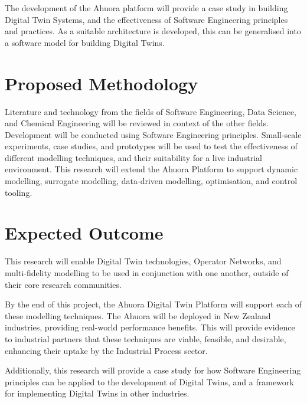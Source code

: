 \documentclass[12pt]{article}
\begin{document}
The development of the Ahuora platform will provide a case study in building Digital Twin Systems, and the effectiveness of Software Engineering principles and practices. As a suitable architecture is developed, this can be generalised into a software model for building Digital Twins.  

\section*{Proposed Methodology}

% 

Literature and technology from the fields of Software Engineering, Data Science, and Chemical Engineering will be reviewed in context of the other fields.
Development will be conducted using Software Engineering principles. Small-scale experiments, case studies, and prototypes will be used to test the effectiveness of different modelling techniques, and their suitability for a live industrial environment. 
This research will extend the Ahuora Platform to support dynamic modelling, surrogate modelling, data-driven modelling, optimisation, and control tooling. 

\section*{Expected Outcome}

This research will enable Digital Twin technologies, Operator Networks, and multi-fidelity modelling to be used in conjunction with one another, outside of their core research communities.

By the end of this project, the Ahuora Digital Twin Platform will support each of these modelling techniques. The Ahuora will be deployed in New Zealand industries, providing real-world performance benefits. This will provide evidence to industrial partners that these techniques are viable, feasible, and desirable, enhancing their uptake by the Industrial Process sector. 

Additionally, this research will provide a case study for how Software Engineering principles can be applied to the development of Digital Twins, and a framework for implementing Digital Twins in other industries.
\end{document}

